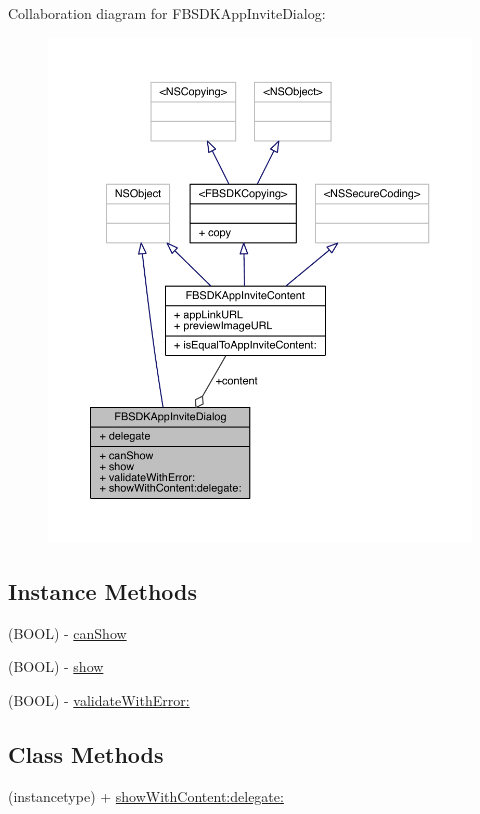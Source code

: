Collaboration diagram for F\-B\-S\-D\-K\-App\-Invite\-Dialog\-:
\nopagebreak
\begin{figure}[H]
\begin{center}
\leavevmode
\includegraphics[width=350pt]{interface_f_b_s_d_k_app_invite_dialog__coll__graph}
\end{center}
\end{figure}
\subsection*{Instance Methods}
\begin{DoxyCompactItemize}
\item 
(B\-O\-O\-L) -\/ \hyperlink{interface_f_b_s_d_k_app_invite_dialog_a77e76bfb138db2103dc112800a89eeb3}{can\-Show}
\item 
(B\-O\-O\-L) -\/ \hyperlink{interface_f_b_s_d_k_app_invite_dialog_a0b425a2d9004ee600a2dcb80ef3fbb77}{show}
\item 
(B\-O\-O\-L) -\/ \hyperlink{interface_f_b_s_d_k_app_invite_dialog_a2e1f0fa58adabb4c7f2e813aaa64c794}{validate\-With\-Error\-:}
\end{DoxyCompactItemize}
\subsection*{Class Methods}
\begin{DoxyCompactItemize}
\item 
(instancetype) + \hyperlink{interface_f_b_s_d_k_app_invite_dialog_abdf3e4d32d0929976d6eea25a0c267d6}{show\-With\-Content\-:delegate\-:}
\end{DoxyCompactItemize}
